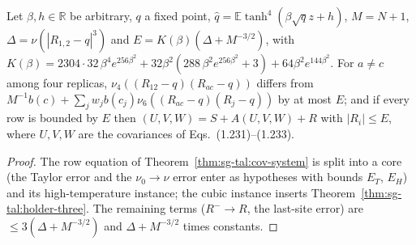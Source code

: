 \begin{theorem}
\label{thm:sg-tal:row-three}
  \leanok
{}
Let $\beta,h\in\mathbb R$ be arbitrary, $q$ a fixed point, $\hat q=\mathbb E\tanh^4(\beta\sqrt qz+h)$, $M=N+1$,
$\Delta=\nu(|R_{1,2}-q|^3)$ and $E=K(\beta)(\Delta+M^{-3/2})$, with $K(\beta)=2304\cdot32\,\beta^4e^{256\beta^2}+32\beta^2(288\,\beta^2e^{256\beta^2}+3)+64\beta^2e^{144\beta^2}$.
For $a\ne c$ among four replicas, $\nu_4((R_{12}-q)(R_{ac}-q))$ differs from $M^{-1}b(c)+\sum_jw_jb(c_j)\nu_6((R_{ac}-q)(R_j-q))$ by at most $E$; and
if every row is bounded by $E$ then $(U,V,W)=S+A(U,V,W)+R$ with $|R_i|\le E$, where $U,V,W$ are the covariances of Eqs.~(1.231)--(1.233).
\end{theorem}
\begin{proof}
  \leanok
The row equation of Theorem~\ref{thm:sg-tal:cov-system} is split into a core (the Taylor error and the $\nu_0\to\nu$ error enter as hypotheses
with bounds $E_T$, $E_H$) and its high-temperature instance; the cubic instance inserts Theorem~\ref{thm:sg-tal:holder-three}.
The remaining terms ($R^-\to R$, the last-site error) are $\le3(\Delta+M^{-3/2})$ and $\Delta+M^{-3/2}$ times constants.
\end{proof}

